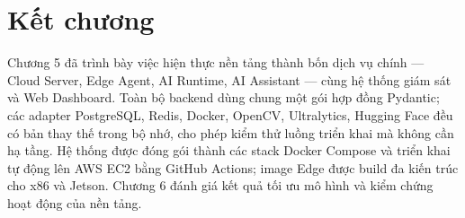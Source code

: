\section{Kết chương}

Chương 5 đã trình bày việc hiện thực nền tảng thành bốn dịch vụ chính --- Cloud
Server, Edge Agent, AI Runtime, AI Assistant --- cùng hệ thống giám sát và Web
Dashboard. Toàn bộ backend dùng chung một gói hợp đồng Pydantic; các adapter
PostgreSQL, Redis, Docker, OpenCV, Ultralytics, Hugging Face đều có bản thay thế
trong bộ nhớ, cho phép kiểm thử luồng triển khai mà không cần hạ tầng. Hệ thống
được đóng gói thành các stack Docker Compose và triển khai tự động lên AWS EC2
bằng GitHub Actions; image Edge được build đa kiến trúc cho x86 và Jetson.
Chương 6 đánh giá kết quả tối ưu mô hình và kiểm chứng hoạt động của nền tảng.

